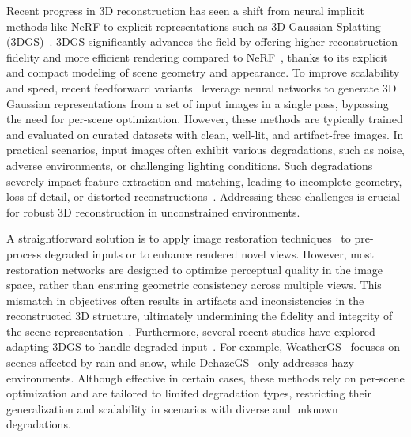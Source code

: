 \documentclass[letterpaper]{article} %
\begin{document}
Recent progress in 3D reconstruction has seen a shift from neural implicit methods like NeRF to explicit representations such as 3D Gaussian Splatting (3DGS)~\cite{kerbl20233d}. 3DGS significantly advances the field by offering higher reconstruction fidelity and more efficient rendering compared to NeRF~\cite{mildenhall2021nerf}, thanks to its explicit and compact modeling of scene geometry and appearance. To improve scalability and speed, recent feedforward variants~\cite{szymanowicz2024splatter,tang2024lgm,charatan23pixelsplat,chen2024mvsplat,smart2024splatt3r,ye2024no} leverage neural networks to generate 3D Gaussian representations from a set of input images in a single pass, bypassing the need for per-scene optimization. However, these methods are typically trained and evaluated on curated datasets with clean, well-lit, and artifact-free images. In practical scenarios, input images often exhibit various degradations, such as noise, adverse environments, or challenging lighting conditions. Such degradations severely impact feature extraction and matching, leading to incomplete geometry, loss of detail, or distorted reconstructions~\cite{riegler2020free,liu2023robust,catley2024roguenerf,wu2024rafe,kwon2025r3evision}. Addressing these challenges is crucial for robust 3D reconstruction in unconstrained environments.



A straightforward solution is to apply image restoration techniques~\cite{chee2018airnet,liang2021swinir,su2022survey} to pre-process degraded inputs or to enhance rendered novel views. However, most restoration networks are designed to optimize perceptual quality in the image space, rather than ensuring geometric consistency across multiple views. This mismatch in objectives often results in artifacts and inconsistencies in the reconstructed 3D structure, ultimately undermining the fidelity and integrity of the scene representation~\cite{philip2019multi,jain2021putting,zhou2023sparsefusion,chen2024pgsr}. Furthermore, several recent studies have explored adapting 3DGS to handle degraded input~\cite{li2024chaos,chen2024deblur,cui2025luminance}. For example, WeatherGS~\cite{qian2024weathergs} focuses on scenes affected by rain and snow, while DehazeGS~\cite{ma2025dehazegs} only addresses hazy environments. Although effective in certain cases, these methods rely on per-scene optimization and are tailored to limited degradation types, restricting their generalization and scalability in scenarios with diverse and unknown degradations.
\end{document}
